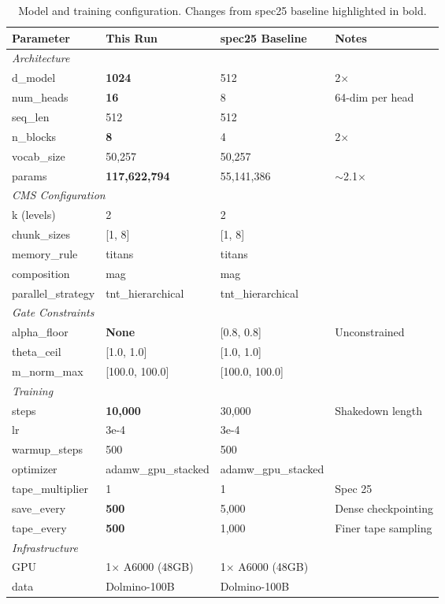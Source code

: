 \documentclass[11pt,a4paper]{article}
\begin{document}
\begin{table}[H]
\centering
\caption{Model and training configuration. Changes from spec25 baseline highlighted in bold.}
\begin{tabular}{llll}
\toprule
\textbf{Parameter} & \textbf{This Run} & \textbf{spec25 Baseline} & \textbf{Notes} \\
\midrule
\multicolumn{4}{l}{\textit{Architecture}} \\
\quad d\_model & \textbf{1024} & 512 & 2$\times$ \\
\quad num\_heads & \textbf{16} & 8 & 64-dim per head \\
\quad seq\_len & 512 & 512 & \\
\quad n\_blocks & \textbf{8} & 4 & 2$\times$ \\
\quad vocab\_size & 50,257 & 50,257 & \\
\quad params & \textbf{117,622,794} & 55,141,386 & $\sim$2.1$\times$ \\
\midrule
\multicolumn{4}{l}{\textit{CMS Configuration}} \\
\quad k (levels) & 2 & 2 & \\
\quad chunk\_sizes & [1, 8] & [1, 8] & \\
\quad memory\_rule & titans & titans & \\
\quad composition & mag & mag & \\
\quad parallel\_strategy & tnt\_hierarchical & tnt\_hierarchical & \\
\midrule
\multicolumn{4}{l}{\textit{Gate Constraints}} \\
\quad alpha\_floor & \textbf{None} & [0.8, 0.8] & Unconstrained \\
\quad theta\_ceil & [1.0, 1.0] & [1.0, 1.0] & \\
\quad m\_norm\_max & [100.0, 100.0] & [100.0, 100.0] & \\
\midrule
\multicolumn{4}{l}{\textit{Training}} \\
\quad steps & \textbf{10,000} & 30,000 & Shakedown length \\
\quad lr & 3e-4 & 3e-4 & \\
\quad warmup\_steps & 500 & 500 & \\
\quad optimizer & adamw\_gpu\_stacked & adamw\_gpu\_stacked & \\
\quad tape\_multiplier & 1 & 1 & Spec 25 \\
\quad save\_every & \textbf{500} & 5,000 & Dense checkpointing \\
\quad tape\_every & \textbf{500} & 1,000 & Finer tape sampling \\
\midrule
\multicolumn{4}{l}{\textit{Infrastructure}} \\
\quad GPU & 1$\times$ A6000 (48GB) & 1$\times$ A6000 (48GB) & \\
\quad data & Dolmino-100B & Dolmino-100B & \\
\bottomrule
\end{tabular}
\end{table}
\end{document}
